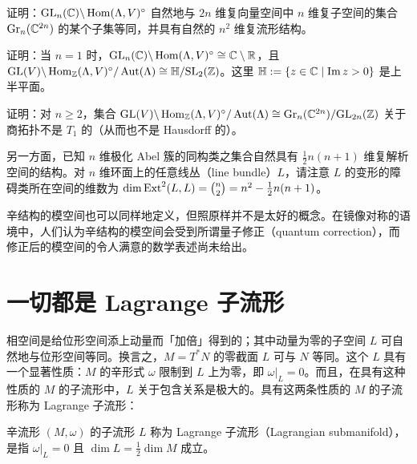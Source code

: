 \begin{exercise}
证明：$\mathrm{GL}_n(\mathbb{C})\backslash\operatorname{Hom}(\Lambda,V)^\circ$ 自然地与 $2n$ 维复向量空间中 $n$ 维复子空间的集合 $\mathrm{Gr}_n(\mathbb{C}^{2n})$ 的某个子集等同，并具有自然的 $n^2$ 维复流形结构。
\end{exercise}

\begin{exercise}
证明：当 $n=1$ 时，$\mathrm{GL}_n(\mathbb{C})\backslash\operatorname{Hom}(\Lambda,V)^\circ\cong\mathbb{C}\setminus\mathbb{R}$，且 $\mathrm{GL}(V)\backslash\operatorname{Hom}_{\mathbb{Z}}(\Lambda,V)^\circ/\operatorname{Aut}(\Lambda)\cong\mathbb{H}/\mathrm{SL}_2(\mathbb{Z})$。这里 $\mathbb{H}:=\{z\in\mathbb{C}\mid\operatorname{Im}z>0\}$ 是上半平面。
\end{exercise}

\begin{exercise}
证明：对 $n\ge2$，集合 $\mathrm{GL}(V)\backslash\operatorname{Hom}_{\mathbb{Z}}(\Lambda,V)^\circ/\operatorname{Aut}(\Lambda)\cong\mathrm{Gr}_n(\mathbb{C}^{2n})/\mathrm{GL}_{2n}(\mathbb{Z})$ 关于商拓扑不是 $T_1$ 的（从而也不是 Hausdorff 的）。
\end{exercise}

另一方面，已知 $n$ 维极化 Abel 簇的同构类之集合自然具有 $\frac{1}{2}n(n+1)$ 维复解析空间的结构。对 $n$ 维环面上的任意线丛（line bundle）$L$，请注意 $L$ 的变形的障碍类所在空间的维数为 $\dim\operatorname{Ext}^2(L,L)=\binom{n}{2}=n^2-\frac{1}{2}n(n+1)$。

\begin{remark}
辛结构的模空间也可以同样地定义，但照原样并不是太好的概念。在镜像对称的语境中，人们认为辛结构的模空间会受到所谓量子修正（quantum correction），而修正后的模空间的令人满意的数学表述尚未给出。
\end{remark}

\section{一切都是 Lagrange 子流形}

相空间是给位形空间添上动量而「加倍」得到的；其中动量为零的子空间 $L$ 可自然地与位形空间等同。换言之，$M=T^*N$ 的零截面 $L$ 可与 $N$ 等同。这个 $L$ 具有一个显著性质：$M$ 的辛形式 $\omega$ 限制到 $L$ 上为零，即 $\omega|_L=0$。而且，在具有这种性质的 $M$ 的子流形中，$L$ 关于包含关系是极大的。具有这两条性质的 $M$ 的子流形称为 Lagrange 子流形：

\begin{definition}
辛流形 $(M,\omega)$ 的子流形 $L$ 称为 Lagrange 子流形（Lagrangian submanifold），是指 $\omega|_L=0$ 且 $\dim L=\frac{1}{2}\dim M$ 成立。
\end{definition}

